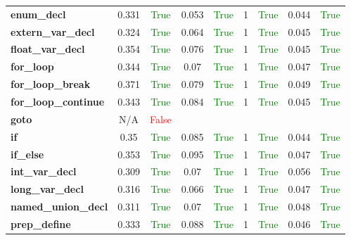 \documentclass{article}
\begin{document}
\begin{xltabular}{\textwidth}{lcccccccc}
\textbf{{\fontsize{10}{12}\selectfont enum\_decl}}& 0.331&\textcolor{green}{True}& 0.053&\textcolor{green}{True}& 1&\textcolor{green}{True}& 0.044&\textcolor{green}{True} \\[0.5ex]
\textbf{{\fontsize{10}{12}\selectfont extern\_var\_decl}}& 0.324&\textcolor{green}{True}& 0.064&\textcolor{green}{True}& 1&\textcolor{green}{True}& 0.045&\textcolor{green}{True} \\[0.5ex]
\textbf{{\fontsize{10}{12}\selectfont float\_var\_decl}}& 0.354&\textcolor{green}{True}& 0.076&\textcolor{green}{True}& 1&\textcolor{green}{True}& 0.045&\textcolor{green}{True} \\[0.5ex]
\textbf{{\fontsize{10}{12}\selectfont for\_loop}}& 0.344&\textcolor{green}{True}& 0.07&\textcolor{green}{True}& 1&\textcolor{green}{True}& 0.047&\textcolor{green}{True} \\[0.5ex]
\textbf{{\fontsize{10}{12}\selectfont for\_loop\_break}}& 0.371&\textcolor{green}{True}& 0.079&\textcolor{green}{True}& 1&\textcolor{green}{True}& 0.049&\textcolor{green}{True} \\[0.5ex]
\textbf{{\fontsize{10}{12}\selectfont for\_loop\_continue}}& 0.343&\textcolor{green}{True}& 0.084&\textcolor{green}{True}& 1&\textcolor{green}{True}& 0.045&\textcolor{green}{True} \\[0.5ex]
\textbf{{\fontsize{10}{12}\selectfont goto}}& N/A&\textcolor{red}{False} \\[0.5ex]
\textbf{{\fontsize{10}{12}\selectfont if}}& 0.35&\textcolor{green}{True}& 0.085&\textcolor{green}{True}& 1&\textcolor{green}{True}& 0.044&\textcolor{green}{True} \\[0.5ex]
\textbf{{\fontsize{10}{12}\selectfont if\_else}}& 0.353&\textcolor{green}{True}& 0.095&\textcolor{green}{True}& 1&\textcolor{green}{True}& 0.047&\textcolor{green}{True} \\[0.5ex]
\textbf{{\fontsize{10}{12}\selectfont int\_var\_decl}}& 0.309&\textcolor{green}{True}& 0.07&\textcolor{green}{True}& 1&\textcolor{green}{True}& 0.056&\textcolor{green}{True} \\[0.5ex]
\textbf{{\fontsize{10}{12}\selectfont long\_var\_decl}}& 0.316&\textcolor{green}{True}& 0.066&\textcolor{green}{True}& 1&\textcolor{green}{True}& 0.047&\textcolor{green}{True} \\[0.5ex]
\textbf{{\fontsize{10}{12}\selectfont named\_union\_decl}}& 0.311&\textcolor{green}{True}& 0.07&\textcolor{green}{True}& 1&\textcolor{green}{True}& 0.048&\textcolor{green}{True} \\[0.5ex]
\textbf{{\fontsize{10}{12}\selectfont prep\_define}}& 0.333&\textcolor{green}{True}& 0.088&\textcolor{green}{True}& 1&\textcolor{green}{True}& 0.046&\textcolor{green}{True} \\[0.5ex]

\end{xltabular}
\end{document}
